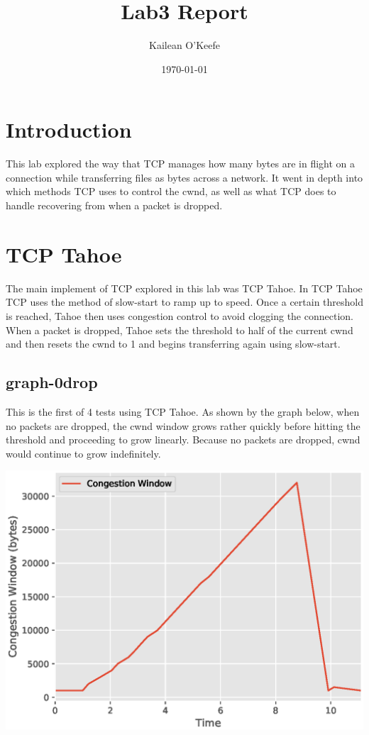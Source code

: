 \documentclass[a4paper,11pt]{article}
\begin{document}
\title{Lab3 Report}
\author{Kailean O'Keefe}
\date{\today}
\maketitle

\section*{Introduction}
This lab explored the way that TCP manages how many bytes are in flight on a connection while transferring files as bytes across a network. It went in depth into which methods TCP uses to control the cwnd, as well as what TCP does to handle recovering from when a packet is dropped. 

\section*{TCP Tahoe}
The main implement of TCP explored in this lab was TCP Tahoe. In TCP Tahoe TCP uses the method of slow-start to ramp up to speed. Once a certain threshold is reached, Tahoe then uses congestion control to avoid clogging the connection. When a packet is dropped, Tahoe sets the threshold to half of the current cwnd and then resets the cwnd to 1 and begins transferring again using slow-start.

\pagebreak

\subsection{graph-0drop}
This is the first of 4 tests using TCP Tahoe. As shown by the graph below, when no packets are dropped, the cwnd window grows rather quickly before hitting the threshold and proceeding to grow linearly. Because no packets are dropped, cwnd would continue to grow indefinitely.

\begin{center}
\includegraphics[width=\linewidth]{graphs-0drop/cwnd}
\end{center}
\end{document}
